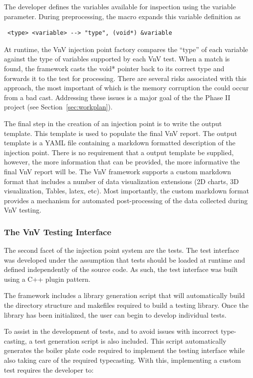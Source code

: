 The developer defines the variables available for inspection using the variable parameter. During preprocessing, the macro expands this variable definition as 
\begin{verbatim}
 <type> <variable> --> "type", (void*) &variable 
\end{verbatim}

At runtime, the VnV injection point factory compares the ``type'' of each variable against the type of variables supported by each 
VnV test. When a match is found, the framework casts the void* pointer back to its correct type and forwards it to the test for processing. There are several risks associated with this approach, the most important of which is the memory corruption the could occur from a bad cast. Addressing these issues is a major goal of the the Phase II project (see Section~\ref{sec:workplan}).

The final step in the creation of an injection point is to write the output template. This template is used to populate 
the final VnV report. The output template is a YAML file containing a markdown formatted description of the injection point. There is 
no requirement that a output template be supplied, however, the more information that can be provided, the more informative the final VnV report will be. The VnV framework supports a custom markdown format that includes a number of data visualization extensions (2D charts, 3D visualization, Tables, latex, etc). Most importantly, the custom markdown format provides a mechanism for automated post-processing of the data collected during VnV testing. 

\subsubsection{The VnV Testing Interface}

The second facet of the injection point system are the \VV tests. The test interface was developed under the assumption that tests should be loaded at runtime and defined independently of the source code. As such, the test interface was built using a C++ plugin pattern. 

The framework includes a library generation script that will automatically build the directory structure and makefiles required to 
build a testing library. Once the library has been initialized, the user can begin to develop individual tests. 

To assist in the development of tests, and to avoid issues with incorrect type-casting, a test generation script is also included. This script automatically generates the boiler plate code required to implement the testing interface while also taking care of the required typecasting. With this, implementing a custom test requires the developer to:



